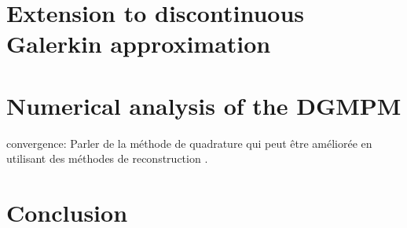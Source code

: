 \section{Extension to discontinuous Galerkin approximation}
\label{sec:DGMPM}


\section{Numerical analysis of the DGMPM}
\label{sec:DGMPM_analysis}


convergence: Parler de la méthode de quadrature qui peut être améliorée en utilisant des méthodes de reconstruction \cite{BsplineMPM}\cite{MPM_BSpline1}.



\section*{Conclusion}

